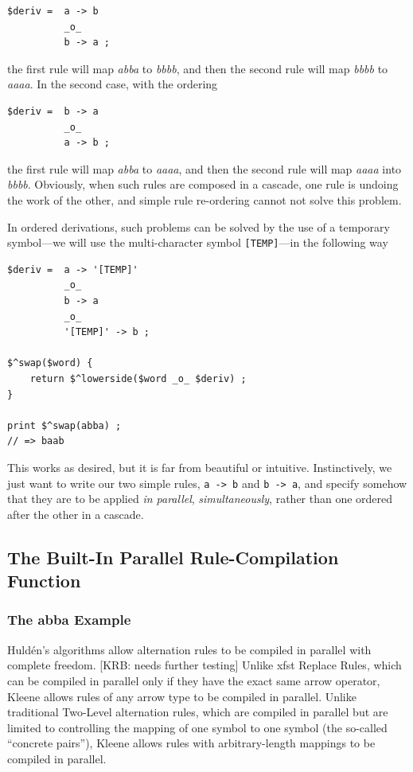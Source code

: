 \begin{Verbatim}
$deriv =  a -> b
          _o_
          b -> a ;
\end{Verbatim}

\noindent
the first rule will map \emph{abba} to \emph{bbbb}, and then the second rule will map
\emph{bbbb} to \emph{aaaa}.  In the second case, with the ordering


\begin{Verbatim}
$deriv =  b -> a
          _o_
          a -> b ;
\end{Verbatim}

\noindent
the first rule will map \emph{abba} to \emph{aaaa}, and then the second rule will map
\emph{aaaa} into \emph{bbbb}.  Obviously, when such rules are composed
in a cascade, one rule is undoing the work
of the other, and simple rule re-ordering cannot not solve this
problem.

In ordered derivations, such problems can be solved by the use of a temporary symbol---we
will use the multi-character symbol \verb![TEMP]!---in the following way


\begin{Verbatim}
$deriv =  a -> '[TEMP]'
          _o_
          b -> a
          _o_
          '[TEMP]' -> b ;

$^swap($word) {
    return $^lowerside($word _o_ $deriv) ;
}

print $^swap(abba) ;
// => baab
\end{Verbatim}

\noindent
This works as desired, but it is far from beautiful or intuitive.  
Instinctively, we just want to write our two
simple rules, \verb!a -> b! and \verb!b -> a!, and specify somehow that they are to be
applied \emph{in parallel}, \emph{simultaneously}, rather than one ordered after the
other in a cascade. 

\newcommand{\dollar}{\char'44}

\subsection{The Built-In Parallel Rule-Compilation Function}

\subsubsection{The abba Example}

Huld\'en's algorithms allow alternation rules to be compiled in parallel with complete
freedom. [KRB:  needs further testing]
 Unlike xfst Replace Rules, which can be compiled in parallel only if they have the exact same arrow operator,
Kleene allows rules of any arrow type to be compiled in parallel.  Unlike traditional Two-Level alternation rules, which are
compiled in parallel but are
limited to controlling the mapping of one symbol to one symbol (the so-called ``concrete pairs''), Kleene allows
rules with arbitrary-length mappings to be compiled in parallel.

